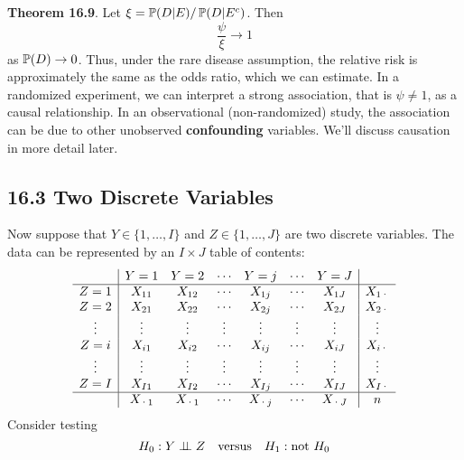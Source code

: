 \textbf{Theorem 16.9}. Let
\(\xi = \operatorname{\mathbb{P}}(D | E) / \operatorname{\mathbb{P}}(D | E^{c})\). Then
\[
\frac{\psi}{\xi} \rightarrow 1
\]
as \(\operatorname{\mathbb{P}}(D) \rightarrow 0\).
Thus, under the rare disease assumption, the relative risk is
approximately the same as the odds ratio, which we can estimate.
In a randomized experiment, we can interpret a strong association, that
is \(\psi \neq 1\), as a causal relationship. In an observational
(non-randomized) study, the association can be due to other unobserved
\textbf{confounding} variables. We'll discuss causation in more detail
later.

\subsection*{16.3 Two Discrete
Variables}\label{two-discrete-variables}
Now suppose that \(Y \in \{ 1, \dots, I \}\) and
\(Z \in \{ 1, \dots, J \}\) are two discrete variables. The data can be
represented by an \(I \times J\) table of contents:
    \[
\begin{array}{c|cccccc|c} 
       & Y = 1  & Y = 2  & \cdots & Y = j & \cdots & Y = J   & \\
\hline
Z = 1 & X_{11}  & X_{12} & \cdots & X_{1j} & \cdots & X_{1J} & X_{1\text{·}}\\
Z = 2 & X_{21}  & X_{22} & \cdots & X_{2j} & \cdots & X_{2J} & X_{2\text{·}}\\
\vdots & \vdots & \vdots & \vdots & \vdots & \vdots & \vdots & \vdots\\
Z = i & X_{i1}  & X_{i2} & \cdots & X_{ij} & \cdots & X_{iJ} & X_{i\text{·}}\\
\vdots & \vdots & \vdots & \vdots & \vdots & \vdots & \vdots & \vdots\\
Z = I & X_{I1}  & X_{I2} & \cdots & X_{Ij} & \cdots & X_{IJ} & X_{I\text{·}}\\
 \hline
      & X_{\text{·}1} & X_{\text{·}1} & \cdots & X_{\text{·}j} & \cdots & X_{\text{·}J} & n
\end{array}
\]
Consider testing
\[
H_{0}: Y \perp\!\!\!\perp Z
\quad \text{versus} \quad
H_{1}: \text{not } H_{0}
\]

